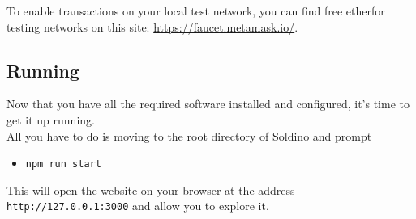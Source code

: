 To enable transactions on your local test network, you can find free ether\glosp for testing networks on this site: \href{https://faucet.metamask.io/}{https://faucet.metamask.io/}.


\subsection{Running}
Now that you have all the required software installed and configured, it's time to get it up running.\\
All you have to do is moving to the root directory of Soldino and prompt
\begin{itemize}
	\item[]\texttt{npm run start}
\end{itemize}
This will open the website on your browser at the address \texttt{http://127.0.0.1:3000} and allow you to explore it. 


%
% 